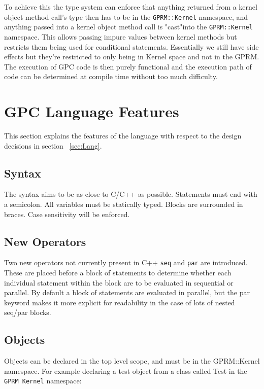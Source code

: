 To achieve this the type system can enforce that anything returned from a kernel object method call's type then has to be in the 
\texttt{GPRM::Kernel} namespace, and anything passed into a kernel object method call is "cast"into the \texttt{GPRM::Kernel}
namespace. This allows passing impure values between kernel methods but restricts them being used
for conditional statements. Essentially we still have side effects but they're restricted to
only being in Kernel space and not in the GPRM. The execution of GPC code is then purely functional
and the execution path of code can be determined at compile time without too much difficulty.

\section{GPC Language Features}

    This section explains the features of the language with respect to the design decisions in section ~\ref{sec:Lang}.

\subsection{Syntax}
        The syntax aims to be as close to C/C++ as possible. Statements must end with a semicolon. 
        All variables must be statically typed. Blocks are surrounded in braces. Case sensitivity
        will be enforced.

\subsection{New Operators}
        Two new operators not currently present in C++ \texttt{seq} and \texttt{par} are introduced. 
        These are placed before a block
        of statements to determine whether each individual statement within the block are
        to be evaluated in sequential or parallel. By default a block of statements are evaluated
        in parallel, but the par keyword makes it more explicit for readability in the case of lots of nested
        seq/par blocks.

\subsection{Objects}
Objects can be declared in the top level scope, and must be in the GPRM::Kernel namespace.
For example declaring a test object from a class called Test in the \texttt{GPRM Kernel} namespace:

